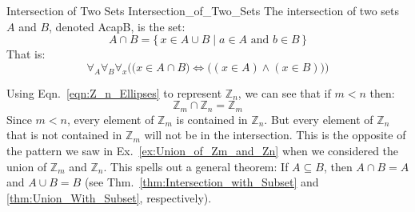        \begin{fdefinition}{Intersection of Two Sets}
                           {Intersection_of_Two_Sets}
            The \gls{intersection of two sets} $A$ and $B$, denoted \gls{AcapB},
            is the set:
            \begin{equation*}
                A\cap{B}
                =\big\{\,x\in{A}\cup{B}\;|\;
                    a\in{A}\textrm{ and }b\in{B}\,\big\}
            \end{equation*}
            That is:
            \begin{equation*}
                \forall_{A}\forall_{B}\forall_{x}\Big(
                    \big(x\in{A}\cap{B}\big)
                    \Leftrightarrow
                    \big((x\in{A})\land(x\in{B})\big)
                \Big)
            \end{equation*}
        \end{fdefinition}
        \begin{example}
            Using Eqn.~\ref{eqn:Z_n_Ellipses} to represent $\mathbb{Z}_{n}$,
            we can see that if $m<n$ then:
            \begin{equation}
                \mathbb{Z}_{m}\cap\mathbb{Z}_{n}=\mathbb{Z}_{m}
            \end{equation}
            Since $m<n$, every element of $\mathbb{Z}_{m}$ is contained in
            $\mathbb{Z}_{n}$. But every element of $\mathbb{Z}_{n}$ that is
            not contained in $\mathbb{Z}_{m}$ will not be in the intersection.
            This is the opposite of the pattern we saw in
            Ex.~\ref{ex:Union_of_Zm_and_Zn} when we considered the union of
            $\mathbb{Z}_{m}$ and $\mathbb{Z}_{n}$. This spells out a general
            theorem: If $A\subseteq{B}$, then $A\cap{B}=A$ and $A\cup{B}=B$
            (see Thm.~\ref{thm:Intersection_with_Subset} and
            \ref{thm:Union_With_Subset}, respectively).
        \end{example}
